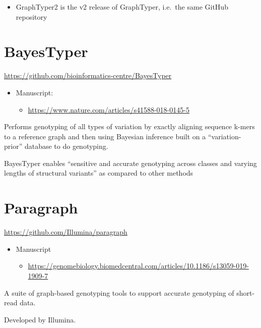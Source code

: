 \documentclass[
]{book}
\providecommand{\tightlist}{%
  \setlength{\itemsep}{0pt}\setlength{\parskip}{0pt}}
\begin{document}
\begin{itemize}
\tightlist
\item
  GraphTyper2 is the v2 release of GraphTyper, i.e.~the same GitHub repository
\end{itemize}

\hypertarget{bayestyper}{%
\section{BayesTyper}\label{bayestyper}}

\url{https://github.com/bioinformatics-centre/BayesTyper}

\begin{itemize}
\tightlist
\item
  Manuscript:

  \begin{itemize}
  \tightlist
  \item
    \url{https://www.nature.com/articles/s41588-018-0145-5}
  \end{itemize}
\end{itemize}

Performs genotyping of all types of variation by exactly aligning sequence k-mers to a reference graph and then using Bayesian inference built on a ``variation-prior'' database to do genotyping.

BayesTyper enables ``sensitive and accurate genotyping across classes and varying lengths of structural variants'' as compared to other methods

\hypertarget{paragraph}{%
\section{Paragraph}\label{paragraph}}

\url{https://github.com/Illumina/paragraph}

\begin{itemize}
\tightlist
\item
  Manuscript

  \begin{itemize}
  \tightlist
  \item
    \url{https://genomebiology.biomedcentral.com/articles/10.1186/s13059-019-1909-7}
  \end{itemize}
\end{itemize}

A suite of graph-based genotyping tools to support accurate genotyping of short-read data.

Developed by Illumina.
\end{document}
